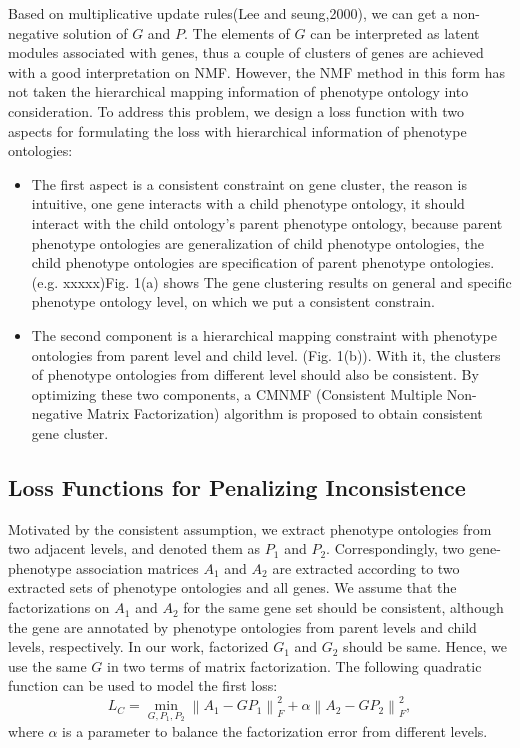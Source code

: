 \documentclass{bmcart}
\begin{document}
Based on multiplicative update rules(Lee and seung,2000), we can get a non-negative solution of $G$ and $P$. The elements of $G$ can be interpreted as latent modules associated with genes, thus a couple of clusters of genes are achieved with a good interpretation on NMF.
However, the NMF method in this form has not taken the hierarchical mapping information of phenotype ontology into consideration. To address this problem, we design a loss function with two aspects for formulating the loss with hierarchical information of phenotype ontologies:
\begin{itemize}
\item The first aspect is a consistent constraint on gene cluster, the reason is intuitive, one gene interacts with a child phenotype ontology, it should interact with the child ontology's parent phenotype ontology, because parent phenotype ontologies are generalization of child phenotype ontologies, the child phenotype ontologies are specification of parent phenotype ontologies. (e.g. xxxxx)Fig. 1(a) shows The gene clustering results on general and specific phenotype ontology level, on which we put a consistent constrain.\\
\item The second component is a hierarchical mapping constraint with phenotype ontologies from parent level and child level. (Fig. 1(b)). With it, the clusters of phenotype ontologies from different level should also be consistent. By optimizing these two components, a CMNMF (Consistent Multiple Non-negative Matrix Factorization) algorithm is proposed to obtain consistent gene cluster.
\end{itemize}
\subsection*{Loss Functions for Penalizing Inconsistence}
Motivated by the consistent assumption, we extract phenotype ontologies from two adjacent levels, and denoted them as $P_{1}$ and $P_{2}$. Correspondingly, two gene-phenotype association matrices $A_{1}$ and $A_{2}$ are extracted according to two extracted sets of phenotype ontologies and all genes. We assume that the factorizations on  $A_{1}$ and $A_{2}$ for the same gene set should be consistent, although the gene are annotated by phenotype ontologies from parent levels and child levels, respectively. In our work, factorized $G_{1}$ and $G_{2}$ should be same. Hence, we use the same $G$ in two terms of matrix factorization. The following quadratic function can be used to model the first loss:
\begin{equation}
{L_C} = \mathop {\min }\limits_{G,{P_1},{P_2}} \left\| {{A_1} - G{P_1}} \right\|_F^2 + \alpha \left\| {{A_2} - G{P_2}} \right\|_F^2,
\end{equation}
where $\alpha$ is a parameter to balance the factorization error from different levels.
\end{document}

